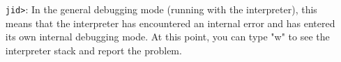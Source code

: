 \begin{itemize}
\begin{itemize}
\item [{\tt jid>}:]
        In the general debugging mode (running with the interpreter),
        this means that the interpreter has encountered an internal 
        error and has entered its own internal debugging mode.  At this 
        point, you can type "w" to see the interpreter stack and report
        the problem.
\end{itemize}
\end{itemize}
